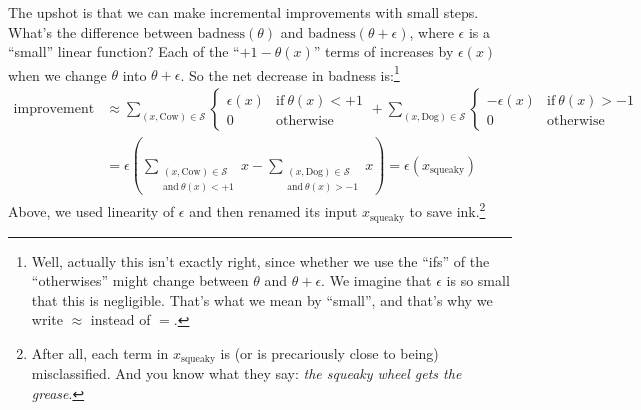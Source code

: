 \documentclass[openany, notitlepage, justified]{tufte-book}
\newcommand{\Ss}{\mathcal{S}}
\begin{document}
            The upshot is that we can make incremental improvements with small
            steps.  What's the difference between
            $\text{badness}(\theta)$ and 
            $\text{badness}(\theta+\epsilon)$, where $\epsilon$ is a ``small''
            linear function?
            Each of the ``$+1-\theta(x)$'' terms of increases by
            $\epsilon(x)$ when we change $\theta$ into $\theta+\epsilon$.  
            So the net decrease in badness is:\footnote{
                Well, actually this isn't exactly right, since whether we use
                the ``ifs'' of the ``otherwises'' might change between $\theta$
                and $\theta + \epsilon$.  We imagine that $\epsilon$ is so
                small that this is negligible.  That's what we mean by ``small'',
                and that's why we write $\approx$ instead of $=$.
            }
            \begin{align*}
                \text{improvement}
                &\approx
                    \sum_{(x,\text{Cow})\in \Ss}
                    \begin{cases} 
                        \epsilon(x)      &       \text{if}~\theta(x) < +1 \\
                        0                &       \text{otherwise}
                    \end{cases}
                    +\sum_{(x,\text{Dog})\in \Ss}
                    \begin{cases} 
                        -\epsilon(x)     &       \text{if}~\theta(x) > -1\\
                        0                &       \text{otherwise}
                    \end{cases}
                    \\
                &=
                    \epsilon\left(
                        \sum_{\substack{(x,\text{Cow})\in \Ss \\ \text{and}~\theta(x)<+1}} x
                        -
                        \sum_{\substack{(x,\text{Dog})\in \Ss \\ \text{and}~\theta(x)>-1}} x
                    \right)
                = \epsilon(x_{\text{squeaky}})
            \end{align*}
            Above, we used linearity of $\epsilon$ and then renamed its input
            $x_{\text{squeaky}}$ to save ink.\footnote{
                After all, each term in $x_{\text{squeaky}}$ is
                (or is precariously close to being) 
                misclassified.
                And you know what they say: \emph{the squeaky wheel gets the grease}.
            }
\end{document}

